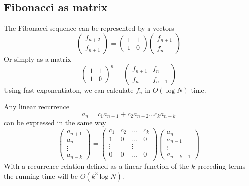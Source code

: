 \documentclass[12pt,t]{beamer}
\begin{document}
\subsection{Fibonacci as matrix}

\begin{frame}[fragile]
  \vspace{20pt}
  The Fibonacci sequence can be represented by a vectors
  \[
    \begin{pmatrix*}
      f_{n+2} \\
      f_{n+1}
    \end{pmatrix*}
    = 
    \begin{pmatrix*}
      1 & 1 \\
      1 & 0
    \end{pmatrix*}
    \begin{pmatrix*}
      f_{n+1} \\
      f_n
    \end{pmatrix*}
  \]
  Or simply as a matrix
  \[
    \begin{pmatrix*}
      1 & 1 \\
      1 & 0
    \end{pmatrix*}^n =
    \begin{pmatrix*}
      f_{n+1} & f_n\\
      f_n & f_{n-1}
    \end{pmatrix*}
  \]
  Using fast exponentiaton, we can calculate $f_n$ in $O(\log N)$ time.
\end{frame}

\begin{frame}
  \vspace{20pt}
  Any linear recurrence 
  \[
    a_n = c_1 a_{n-1} + c_2 a_{n-2} \ldots c_k a_{n-k}
  \]
  can be expressed in the same way
  \[
    \begin{pmatrix*}
      a_{n+1} \\
      a_{n} \\
      \vdots \\
      a_{n-k}
    \end{pmatrix*}
    =
    \begin{pmatrix}
      c_1 & c_2 & \ldots & c_k \\
      1 & 0 & \ldots & 0 \\
      \vdots & & \vdots \\
      0 & 0 & \ldots & 0 \\
    \end{pmatrix}
    \begin{pmatrix*}
      a_{n} \\
      a_{n-1} \\
      \vdots \\
      a_{n-k-1}
    \end{pmatrix*}
  \]
  With a recurrence relation defined as a linear function of the $k$ preceding
  terms the running time will be $O(k^3 \log N)$.
\end{frame}
\end{document}
